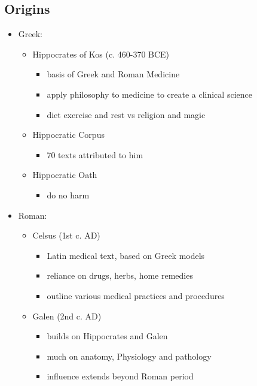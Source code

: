 \documentclass[12pt, twoside]{article}
\begin{document}
\subsection{Origins}
\begin{itemize}
\item Greek:
	\begin{itemize}
	\item Hippocrates of Kos (c. 460-370 BCE)
		\begin{itemize}
		\item basis of Greek and Roman Medicine
		\item apply philosophy to medicine to create a clinical science
		\item diet exercise and rest vs religion and magic
		\end{itemize}
	\item Hippocratic Corpus
		\begin{itemize}
		\item 70 texts attributed to him	
		\end{itemize}
	\item Hippocratic Oath
		\begin{itemize}
		\item do no harm
		\end{itemize}
	\end{itemize}	
\item Roman:
	\begin{itemize}
	\item Celsus (1st c. AD)
		\begin{itemize}
		\item Latin medical text, based on Greek models
		\item reliance on drugs, herbs, home remedies
		\item outline various medical practices and procedures
		\end{itemize}
	\item Galen (2nd c. AD)
		\begin{itemize}
		\item builds on Hippocrates and Galen
		\item much on anatomy, Physiology and pathology
		\item influence extends beyond Roman period
		\end{itemize}
	\end{itemize}
\end{itemize}
\end{document}
